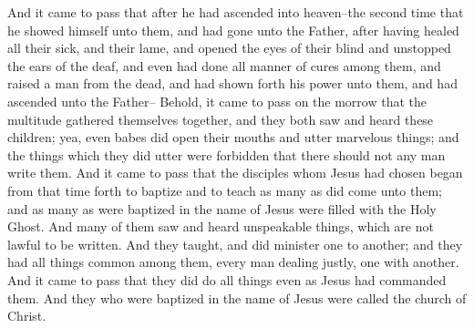 And it came to pass that after he had ascended into heaven--the second time that he showed himself unto them, and had gone unto the Father, after having healed all their sick, and their lame, and opened the eyes of their blind and unstopped the ears of the deaf, and even had done all manner of cures among them, and raised a man from the dead, and had shown forth his power unto them, and had ascended unto the Father--
\bverse \iffalse Behold, it came to pass on the morrow that the multitude gathered themselves together, and they both saw and heard these children; yea, even babes did open their mouths and utter marvelous things; and the things which they did utter were forbidden that there should not any man write them. \fi
Behold, it came to pass on the morrow that the multitude gathered themselves together, and they both saw and heard these children; yea, even babes did open their mouths and utter marvelous things; and the things which they did utter were forbidden that there should not any man write them.
\bverse \iffalse And it came to pass that the disciples whom Jesus had chosen began from that time forth to baptize and to teach as many as did come unto them; and as many as were baptized in the name of Jesus were filled with the Holy Ghost. \fi
And it came to pass that the disciples whom Jesus had chosen began from that time forth to baptize and to teach as many as did come unto them; and as many as were baptized in the name of Jesus were filled with the Holy Ghost.
\bverse \iffalse And many of them saw and heard unspeakable things, which are not lawful to be written. \fi
And many of them saw and heard unspeakable things, which are not lawful to be written.
\bverse \iffalse And they taught, and did minister one to another; and they had all things common among them, every man dealing justly, one with another. \fi
And they taught, and did minister one to another; and they had all things common among them, every man dealing justly, one with another.
\bverse \iffalse And it came to pass that they did do all things even as Jesus had commanded them. \fi
And it came to pass that they did do all things even as Jesus had commanded them.
\bverse \iffalse And they who were baptized in the name of Jesus were called the church of Christ. \fi
And they who were baptized in the name of Jesus were called the church of Christ.
\bchapter
\bverse \iffalse And it came to pass that as the disciples of Jesus were journeying and were preaching the things which they had both heard and seen, and were baptizing in the name of Jesus, it came to pass that the disciples were gathered together and were united in mighty prayer and fasting. \fi
